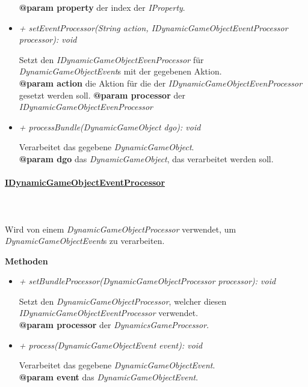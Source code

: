 \begin{itemize}
\begin{leftbar}[0.9\linewidth]
                        \textbf{@param property} der index der \textit{IProperty}.
                    \end{leftbar}
                \item \textit{+ setEventProcessor(String action, IDynamicGameObjectEventProcessor processor): void}
                    \begin{leftbar}[0.9\linewidth]
                        Setzt den \textit{IDynamicGameObjectEvenProcessor} für \textit{DynamicGameObjectEvent}s mit der gegebenen Aktion.\\
                        \textbf{@param action} die Aktion für die der \textit{IDynamicGameObjectEvenProcessor} gesetzt werden soll.
                        \textbf{@param processor} der \textit{IDynamicGameObjectEvenProcessor}
                    \end{leftbar}
                \item \textit{+ processBundle(DynamicGameObject dgo): void}
                    \begin{leftbar}[0.9\linewidth]
                        Verarbeitet das gegebene \textit{DynamicGameObject}.\\
                        \textbf{@param dgo} das \textit{DynamicGameObject}, das verarbeitet werden soll.
                    \end{leftbar}
            \end{itemize}

        \paragraph{\underline{IDynamicGameObjectEventProcessor}} \mbox{}\\
        \\
            Wird von einem \textit{DynamicGameObjectProcessor} verwendet, um \textit{DynamicGameObjectEvent}s zu verarbeiten.\par

            \pagebreak
            \textbf{Methoden}
            \begin{itemize}
                \item \textit{+ setBundleProcessor(DynamicGameObjectProcessor processor): void}
                    \begin{leftbar}[0.9\linewidth]
                        Setzt den \textit{DynamicGameObjectProcessor}, welcher diesen \textit{IDynamicGameObjectEventProcessor} verwendet.\\
                        \textbf{@param processor} der \textit{DynamicsGameProcessor}.
                    \end{leftbar}
                \item \textit{+ process(DynamicGameObjectEvent event): void}
                    \begin{leftbar}[0.9\linewidth]
                        Verarbeitet das gegebene \textit{DynamicGameObjectEvent}.\\
                        \textbf{@param event} das \textit{DynamicGameObjectEvent}.
                    \end{leftbar}
            \end{itemize}

